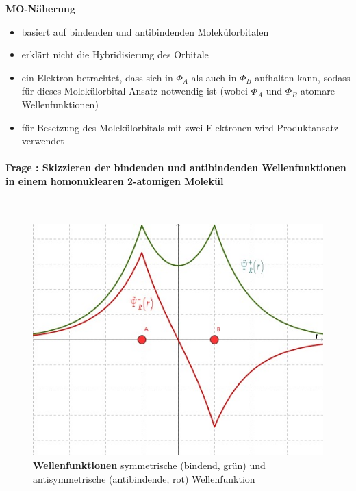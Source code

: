 \documentclass[a4paper, 11pt, ngerman, parskip=half-]{scrartcl}
\newcounter{question}
\newcommand{\question}[1]{\stepcounter{question}\paragraph{Frage \thequestion: #1}~}
\begin{document}
\noindent
\textbf{MO-Näherung}
\begin{itemize}
    \item basiert auf bindenden und antibindenden Molekülorbitalen
    \item erklärt nicht die Hybridisierung des Orbitale
    \item ein Elektron betrachtet, dass sich in $\Phi_A$ als auch in $\Phi_B$ aufhalten kann, sodass für dieses Molekülorbital-Ansatz notwendig ist (wobei $\Phi_A$ und $\Phi_B$ atomare Wellenfunktionen)
    \item für Besetzung des Molekülorbitals mit zwei Elektronen wird Produktansatz verwendet
\end{itemize}
\question{Skizzieren der bindenden und antibindenden Wellenfunktionen in einem homonuklearen 2-atomigen Molekül}
\label{q:42}
\begin{figure}[H]
    \centering
   \begin{minipage}[b]{.4\linewidth} %
      \includegraphics[width=\linewidth]{resources/16-03-2012/sym_und_antisymm_Wellenfunktion.jpeg}
      \caption{\textbf{Wellenfunktionen} symmetrische (bindend, grün) und antisymmetrische (antibindende, rot) Wellenfunktion}
   \end{minipage}
   \hspace{.1\linewidth}%
   \begin{minipage}[b]{.4\linewidth} %

\end{minipage}
\end{figure}
\end{document}
